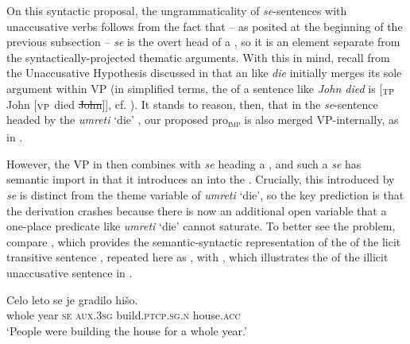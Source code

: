 \documentclass[output=paper,nonflat,newtxmath]{langsci/langscibook}
\begin{document}
On this syntactic proposal, the ungrammaticality of  \textit{se}-sentences with unaccusative verbs follows from the fact that – as posited at the beginning of the previous subsection – \textit{se} is the overt head of a , so it is an element separate from the syntactically-projected thematic arguments. With this in mind, recall from the Unaccusative Hypothesis discussed in  that an  like \textit{die} initially merges its sole argument within VP (in simplified terms, the  of a sentence like \textit{John died} is [$_{\textsc{TP}}$ John [$_{\textsc{VP}}$ died \st{John}]], cf. ). It stands to reason, then, that in the   \textit{se}-sentence headed by the  \textit{umreti} `die' , our proposed pro\textsubscript{\textsc{imp}} is also merged VP-internally, as in .
\begin{exe}
\ex
\begin{xlist}
 \label{VcUm2}
\end{xlist}
\end{exe}


\noindent However, the VP in  then combines with \textit{se} heading a , and such a \textit{se} has semantic import in that it introduces an  into the . Crucially, this  introduced by \textit{se} is distinct from the theme variable of \textit{umreti} `die', so the key prediction is that the derivation crashes because there is now an additional open variable that a one-place predicate like \textit{umreti} `die' cannot saturate. To better see the problem, compare , which provides the semantic-syntactic representation of the  of the licit transitive sentence , repeated here as , with , which illustrates the  of the illicit unaccusative sentence in .
\begin{exe}
\ex \label{repeated} \gll Celo leto se je gradilo hišo.\\
   whole year \textsc{se} \textsc{aux}.\textsc{3sg} build.\textsc{ptcp.sg.n} house.\textsc{acc}\\
\trans `People were building the house for a whole year.'
\end{exe}
\end{document}
